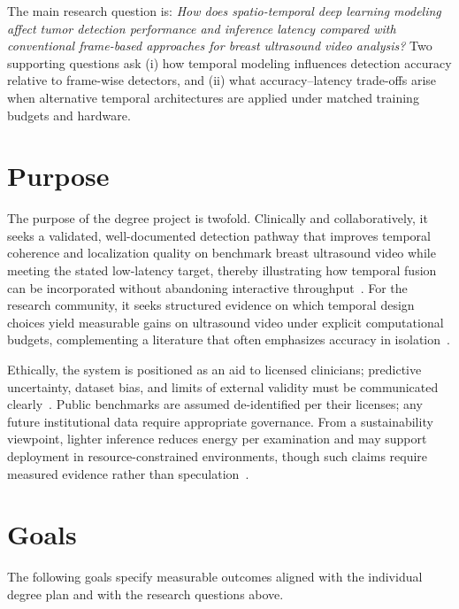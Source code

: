 \documentclass[
english,                 %
bibtex,                  %
]{kththesis}
\numberwithin{listing}{chapter}
\begin{document}
The main research question is: \emph{How does spatio-temporal deep learning modeling affect tumor detection performance and inference latency compared with conventional frame-based approaches for breast ultrasound video analysis?}
Two supporting questions ask (i) how temporal modeling influences detection accuracy relative to frame-wise detectors, and (ii) what accuracy--latency trade-offs arise when alternative temporal architectures are applied under matched training budgets and hardware.

\section{Purpose}

The purpose of the degree project is twofold.
Clinically and collaboratively, it seeks a validated, well-documented detection pathway that improves temporal coherence and localization quality on benchmark breast ultrasound video while meeting the stated low-latency target, thereby illustrating how temporal fusion can be incorporated without abandoning interactive throughput~\cite{lin2022_buv_miccai,liu2023_edgemednet}.
For the research community, it seeks structured evidence on which temporal design choices yield measurable gains on ultrasound video under explicit computational budgets, complementing a literature that often emphasizes accuracy in isolation~\cite{dan2024_breast_us_dl_review,wang2021_ultrasound_dl_review}.

Ethically, the system is positioned as an aid to licensed clinicians; predictive uncertainty, dataset bias, and limits of external validity must be communicated clearly~\cite{dan2024_breast_us_dl_review}.
Public benchmarks are assumed de-identified per their licenses; any future institutional data require appropriate governance.
From a sustainability viewpoint, lighter inference reduces energy per examination and may support deployment in resource-constrained environments, though such claims require measured evidence rather than speculation~\cite{liu2023_edgemednet}.

\section{Goals}

The following goals specify measurable outcomes aligned with the individual degree plan and with the research questions above.
\end{document}
